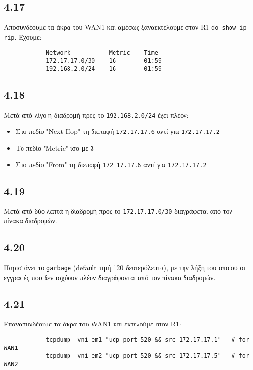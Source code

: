 \documentclass[a4paper, 12pt]{article}
\begin{document}
	\subsection*{4.17}
		Αποσυνδέουμε τα άκρα του WAN1 και αμέσως ξαναεκτελούμε στον R1 \verb|do show ip rip|. Έχουμε:
		
		\begin{verbatim}
			Network           Metric    Time
			172.17.17.0/30    16        01:59
			192.168.2.0/24    16        01:59
		\end{verbatim}
		
	\subsection*{4.18}
		Μετά από λίγο η διαδρομή προς το \verb|192.168.2.0/24| έχει πλέον:
		
		\begin{itemize}
			\item Στο πεδίο "Next Hop" τη διεπαφή \verb|172.17.17.6| αντί για \verb|172.17.17.2|
			\item Το πεδίο "Metric" ίσο με 3
			\item Στο πεδίο "From" τη διεπαφή \verb|172.17.17.6| αντί για \verb|172.17.17.2|
		\end{itemize} 

	\subsection*{4.19}
		Μετά από δύο λεπτά η διαδρομή προς το \verb|172.17.17.0/30| διαγράφεται από τον πίνακα διαδρομών.

	\subsection*{4.20}
		Παριστάνει το \verb|garbage| (default τιμή 120 δευτερόλεπτα), με την λήξη του οποίου οι εγγραφές που δεν ισχύουν πλέον διαγράφονται από τον πίνακα διαδρομών.

	\subsection*{4.21}
		Επανασυνδέουμε τα άκρα του WAN1 και εκτελούμε στον R1:
		
		\begin{verbatim}
			tcpdump -vni em1 "udp port 520 && src 172.17.17.1"   # for WAN1
			tcpdump -vni em2 "udp port 520 && src 172.17.17.5"   # for WAN2
		\end{verbatim}
		
\end{document}
